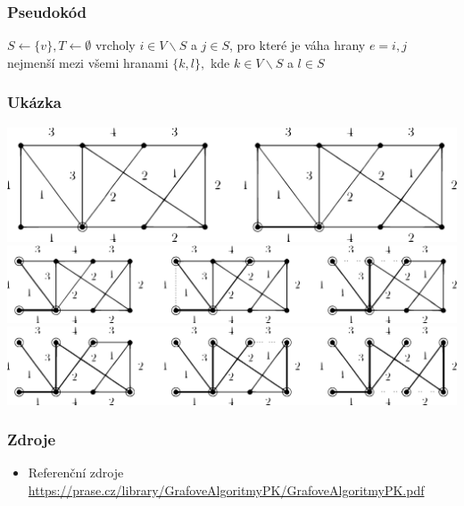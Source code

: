 \documentclass[12pt, hyperref={unicode}]{beamer}
\begin{document}
\begin{frame}
	\frametitle{Pseudokód}
	
	\begin{algorithmic}[1]
	 \STATE $S \leftarrow\{v\}, T \leftarrow \emptyset$
			\STATE vrcholy $i \in V \backslash S$ a $j \in S$, pro které je váha hrany $e = {i, j}$
			\STATE nejmenší mezi všemi hranami $\{k, l\},$ kde $k \in V \backslash S$ a $l \in S$
		\ENDWHILE
	\end{algorithmic}
\end{frame}


\begin{frame}
	\frametitle{Ukázka}
	\centering
	\includegraphics[scale=0.33]{first.eps}
	\pause
	\includegraphics[scale=0.33]{second.eps}
	\pause
	\includegraphics[scale=0.33]{third.eps}		
\end{frame}

\begin{frame}
	\frametitle{Zdroje}
	\begin{itemize}
		\item Referenční zdroje \\
			\url{https://prase.cz/library/GrafoveAlgoritmyPK/GrafoveAlgoritmyPK.pdf} 
	\end{itemize}
\end{frame}
\end{document}
